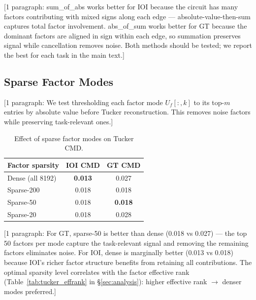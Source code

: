 \documentclass[11pt]{article}
\begin{document}
[1 paragraph: sum\_of\_abs works better for IOI because the circuit has
many factors contributing with mixed signs along each edge ---
absolute-value-then-sum captures total factor involvement. abs\_of\_sum
works better for GT because the dominant factors are aligned in sign
within each edge, so summation preserves signal while cancellation
removes noise. Both methods should be tested; we report the best for
each task in the main text.]


\subsection{Sparse Factor Modes}
\label{app:tucker_sparse}


[1 paragraph: We test thresholding each factor mode $U_f[:,k]$ to its
top-$m$ entries by absolute value before Tucker reconstruction. This
removes noise factors while preserving task-relevant ones.]

\begin{table}[h]
\centering
\caption{Effect of sparse factor modes on Tucker CMD.}
\label{tab:tucker_sparse}
\begin{tabular}{lcc}
\toprule
\textbf{Factor sparsity} & \textbf{IOI CMD} & \textbf{GT CMD} \\
\midrule
Dense (all 8192) & \textbf{0.013} & 0.027 \\
Sparse-200 & 0.018 & 0.018 \\
Sparse-50  & 0.018 & \textbf{0.018} \\
Sparse-20  & 0.018 & 0.028 \\
\bottomrule
\end{tabular}
\end{table}

[1 paragraph: For GT, sparse-50 is better than dense (0.018 vs 0.027) ---
the top 50 factors per mode capture the task-relevant signal and removing
the remaining factors eliminates noise. For IOI, dense is marginally
better (0.013 vs 0.018) because IOI's richer factor structure benefits
from retaining all contributions. The optimal sparsity level correlates
with the factor effective rank (Table~\ref{tab:tucker_effrank} in
\S\ref{sec:analysis}): higher effective rank $\to$ denser modes preferred.]
\end{document}
